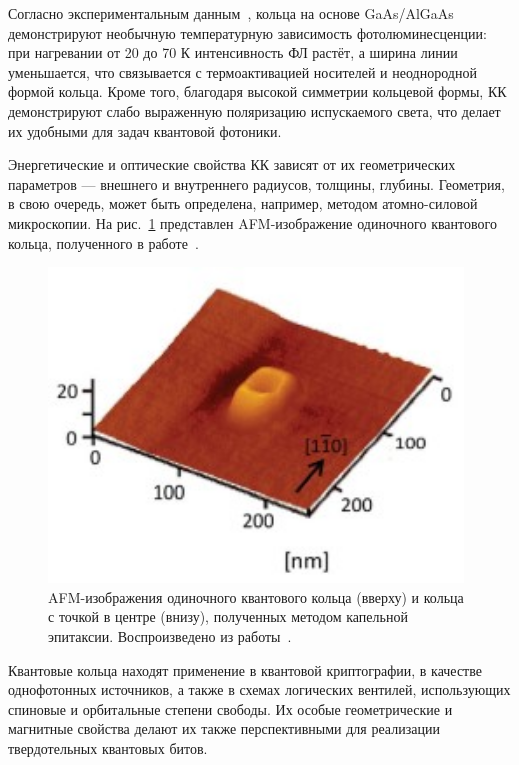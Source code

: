 \documentclass[14pt,oneside]{extarticle}
\begin{document}
Согласно экспериментальным данным~\cite{sibirmovskiy2018}, кольца на основе GaAs/AlGaAs демонстрируют необычную температурную зависимость фотолюминесценции: при нагревании от 20 до 70 К интенсивность ФЛ растёт, а ширина линии уменьшается, что связывается с термоактивацией носителей и неоднородной формой кольца. Кроме того, благодаря высокой симметрии кольцевой формы, КК демонстрируют слабо выраженную поляризацию испускаемого света, что делает их удобными для задач квантовой фотоники.

Энергетические и оптические свойства КК зависят от их геометрических параметров — внешнего и внутреннего радиусов, толщины, глубины. Геометрия, в свою очередь, может быть определена, например, методом атомно-силовой микроскопии. На рис.~\ref{fig:elborg2} представлен AFM-изображение одиночного квантового кольца, полученного в работе~\cite{elborg2017}.

\begin{figure}
    \begin{center}
        \includegraphics[width=11cm]{images/elborg_fig2.png}
        \caption{\label{fig:elborg2}
            AFM-изображения одиночного квантового кольца (вверху) и кольца с точкой в центре (внизу), полученных методом капельной эпитаксии. Воспроизведено из работы~\cite{elborg2017}.}
    \end{center}
\end{figure}

Квантовые кольца находят применение в квантовой криптографии, в качестве однофотонных источников, а также в схемах логических вентилей, использующих спиновые и орбитальные степени свободы. Их особые геометрические и магнитные свойства делают их также перспективными для реализации твердотельных квантовых битов.
\end{document}
